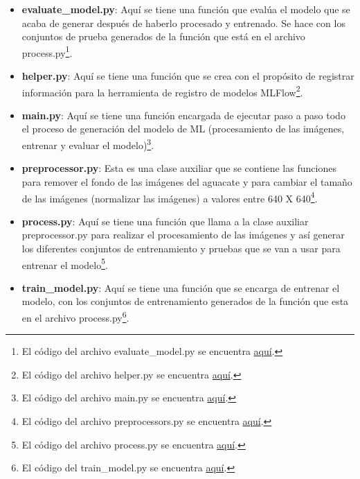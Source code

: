 \begin{itemize}
    \item \textbf{evaluate\_model.py}: Aquí se tiene una función que evalúa el modelo que se acaba de generar después de haberlo procesado y entrenado. Se hace con los conjuntos de prueba generados de la función que está en el archivo process.py\footnote{El código del archivo evaluate\_model.py se encuentra \href{https://github.com/juferoto/mlops_project/blob/master/training/src/evaluate_model.py}{aquí}.}.
    \item \textbf{helper.py}: Aquí se tiene una función que se crea con el propósito de registrar información para la herramienta de registro de modelos MLFlow\footnote{El código del archivo helper.py se encuentra \href{https://github.com/juferoto/mlops_project/blob/master/training/src/helper.py}{aquí}.}.
    \item \textbf{main.py}: Aquí se tiene una función encargada de ejecutar paso a paso todo el proceso de generación del modelo de ML (procesamiento de las imágenes, entrenar y evaluar el modelo)\footnote{El código del archivo main.py se encuentra \href{https://github.com/juferoto/mlops_project/blob/master/training/src/main.py}{aquí}.}.
    \item \textbf{preprocessor.py}: Esta es una clase auxiliar que se contiene las funciones para remover el fondo de las imágenes del aguacate y para cambiar el tamaño de las imágenes (normalizar las imágenes) a valores entre 640 X 640\footnote{El código del archivo preprocessors.py se encuentra \href{https://github.com/juferoto/mlops_project/blob/master/training/src/preprocessors.py}{aquí}.}.
    \item \textbf{process.py}: Aquí se tiene una función que llama a la clase auxiliar preprocessor.py para realizar el procesamiento de las imágenes y así generar los diferentes conjuntos de entrenamiento y pruebas que se van a usar para entrenar el modelo\footnote{El código del archivo process.py se encuentra \href{https://github.com/juferoto/mlops_project/blob/master/training/src/process.py}{aquí}.}.
    \item \textbf{train\_model.py}: Aquí se tiene una función que se encarga de entrenar el modelo, con los conjuntos de entrenamiento generados de la función que esta en el archivo process.py\footnote{El código del train\_model.py se encuentra \href{https://github.com/juferoto/mlops_project/blob/master/training/src/train_model.py}{aquí}.}.
\end{itemize}

\newpage

